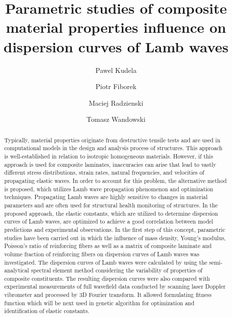 \documentclass[]{spie}  %
\title{Parametric studies of composite material properties influence on dispersion curves of Lamb waves}
\author[a]{Pawel Kudela}
\author[a]{Piotr Fiborek}
\author[a]{Maciej Radzienski}
\author[a]{Tomasz Wandowski}
\affil[a]{Institute of Fluid-Flow Machinery, Polish Academy of Sciences, Fiszera 14 St, 80-231 Gdansk, Poland}
\begin{document}
 
\maketitle

\begin{abstract}
Typically, material properties originate from destructive tensile tests and are used in computational models in the design and analysis process of structures. 
This approach is well-established in relation to isotropic homogeneous materials. 
However, if this approach is used for composite laminates, inaccuracies can arise that lead to vastly different stress distributions, strain rates, natural frequencies, and velocities of propagating elastic waves. 
In order to account for this problem, the alternative method is proposed, which utilizes Lamb wave propagation phenomenon and optimization techniques. 
Propagating Lamb waves are highly sensitive to changes in material parameters and are often used for structural health monitoring of structures.
In the proposed approach, the elastic constants, which are utilized to determine dispersion curves of Lamb waves, are optimized to achieve a good correlation between model predictions and experimental observations. 
In the first step of this concept, parametric studies have been carried out in which the influence of mass density, Young's modulus, Poisson's ratio of reinforcing fibers as well as a matrix of composite laminate and volume fraction of reinforcing fibers on dispersion curves of Lamb waves was investigated. 
The dispersion curves of Lamb waves were calculated by using the semi-analytical spectral element method considering the variability of properties of composite constituents. 
The resulting dispersion curves were also compared with experimental measurements of full wavefield data conducted by scanning laser Doppler vibrometer and processed by 3D Fourier transform. It allowed formulating fitness function which will be next used in genetic algorithm for optimization and identification of elastic constants.
\end{abstract}

\end{document}
